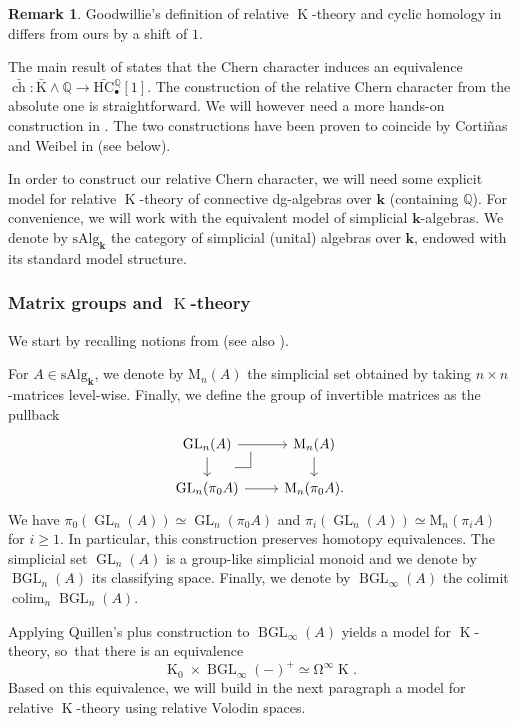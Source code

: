 \documentclass[JEP,XML,SOM,Unicode,NoEqCountersInSection]{cedram}
\let\autoref\Cref
\let\widebar\bar
\newcommand{\sbullet}{{\scriptscriptstyle\bullet}}
\theoremstyle{definition}
\newtheorem{rmq}[thm]{Remark}
\newcommand{\Q}{\mathbb{Q}}
\DeclareMathOperator{\colim}{colim}
\DeclareMathOperator{\BGL}{BGL}
\DeclareMathOperator{\K}{K}
\newcommand{\cart}{\arrow[dr, phantom,
"\text{\tikz[baseline=0em,xscale=0.04em,yscale=0.04em]
\draw[-] (-1,0) -- (0,0) -- (0,1) ;}\mkern1mu\relax",
very near start]}
\newcommand{\bch}{\widebar{\operatorname{ch}}}
\newcommand{\GL}{\operatorname{GL}}
\newcommand{\bK}{\widebar{\mathrm{K}}}
\newcommand{\bHC}{\widebar{\mathrm{HC}}{}}
\newcommand{\infloop}{\operatorname{\Omega^\infty}}
\renewcommand{\k}{{\boldsymbol{k}}}
\newcommand{\sAlg}{\mathrm{sAlg}}
\begin{document}
\begin{rmq}
Goodwillie's definition of relative $\K$-theory and cyclic homology in \cite{goodwillie:tangentk} differs from ours by a shift of $1$.
\end{rmq}

The main result of \cite{goodwillie:tangentk} states that the Chern character induces an equivalence $\bch \colon \bK \wedge \Q \to \bHC_\sbullet^\Q[1]$.
The construction of the relative Chern character from the absolute one is straightforward. We will however need a more hands-on construction in \autoref{sec:tracemap}. The two constructions have been proven to coincide by Cortiñas and Weibel in \cite{cortinasweibel:relative} (see \autoref{rmq:relChern} below).

In order to construct our relative Chern character, we will need some explicit model for relative $\K$-theory of connective dg-algebras over $\k$ (containing $\Q$).
For convenience, we will work with the equivalent model of simplicial $\k$-algebras. We denote by $\sAlg_\k$ the category of simplicial (unital) algebras over $\k$, endowed with its standard model structure.

\subsubsection{Matrix groups and $\K$-theory}

We start by recalling notions from \cite{waldhausen:ktheory} (see also \cite{goodwillie:tangentk}).

For $A \in \sAlg_\k$, we denote by $\mathrm{M}_n(A)$ the simplicial set obtained by taking $n \times n$-matrices level-wise. Finally, we define the group of invertible matrices as the pullback
\[
\begin{tikzcd}[row sep=1.4em]
\GL_n(A) \arrow[r] \cart \arrow[d] & \mathrm{M}_n(A) \arrow[d] \\
\GL_n(\pi_0A) \arrow[r] & \mathrm{M}_n(\pi_0A).
\end{tikzcd}
\]
We have $\pi_0(\GL_n(A)) \simeq \GL_n(\pi_0A)$ and $\pi_i(\GL_n(A)) \simeq \mathrm{M}_n(\pi_i A)$ for $i \geq 1$. In particular, this construction preserves homotopy equivalences. The simplicial set $\GL_n(A)$ is a group-like simplicial monoid and we denote by $\BGL_n(A)$ its classifying space.
Finally, we denote by $\BGL_\infty(A)$ the colimit $\colim_n \BGL_n(A)$.

Applying Quillen's plus construction to $\BGL_\infty(A)$ yields a model for $\K$-theory, so~that there is an equivalence\vspace*{-3pt}\enlargethispage{.8\baselineskip}%
\[
\K_0 \times \BGL_\infty(-)^+ \simeq \infloop \K.
\]
Based on this equivalence, we will build in the next paragraph a model for relative $\K$-theory using relative Volodin spaces.
\end{document}

